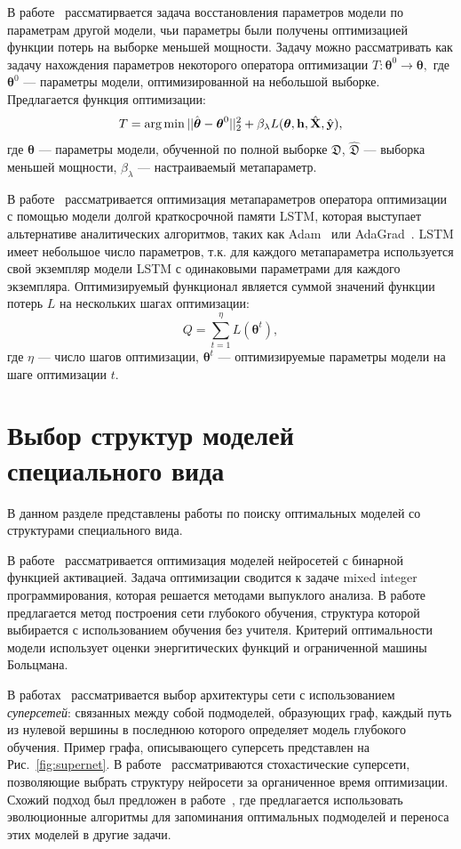 В работе~\cite{l2l} рассматирвается задача восстановления параметров модели по параметрам  другой модели, чьи параметры были получены оптимизацией функции потерь на выборке меньшей мощности. Задачу можно рассматривать как задачу нахождения параметров некоторого оператора оптимизации $T:\boldsymbol{\theta}^0 \to \boldsymbol{\theta},$ где $\boldsymbol{\theta}^0$ --- параметры модели, оптимизированной на небольшой выборке.  Предлагается функция оптимизации:
\[
    T = \operatorname*{arg\,min} ||\hat{\boldsymbol{\theta}} -  \boldsymbol{\theta}^0||_2^2 + \beta_{\lambda} L(\boldsymbol{\theta},  \mathbf{h},  \hat{\mathbf{X}}, \hat{\mathbf{y}}),
\]
где $\boldsymbol{\theta}$ --- параметры модели, обученной по полной выборке $\mathfrak{D}$, $\hat{\mathfrak{D}}$ --- выборка меньшей мощности, $\beta_{\lambda}$ --- настраиваемый метапараметр.

В работе~\cite{l2l_by_gd_gd} рассматривается оптимизация метапараметров оператора оптимизации с помощью модели долгой краткосрочной памяти LSTM, которая выступает альтернативе аналитических алгоритмов, таких как Adam~\cite{adam} или AdaGrad~\cite{adagrad}. LSTM имеет небольшое число параметров, т.к. для каждого метапараметра используется свой экземпляр модели LSTM с одинаковыми параметрами для каждого экземпляра. Оптимизируемый функционал является суммой значений функции потерь $L$ на нескольких шагах оптимизации:
\[
   Q = \sum_{t=1}^\eta L(\boldsymbol{\theta}^t),
\]
где $\eta$ --- число шагов оптимизации, $\boldsymbol{\theta}^t$ --- оптимизируемые параметры модели на шаге оптимизации $t$.


\section{Выбор структур моделей специального вида}
В данном разделе представлены работы по поиску оптимальных моделей со структурами специального вида.

В работе~\cite{mixed} рассматривается оптимизация моделей нейросетей с бинарной функцией активацией. Задача оптимизации сводится к задаче mixed integer программирования, которая решается методами выпуклого анализа.
В работе~\cite{energynet} предлагается метод построения сети глубокого обучения, структура которой выбирается с использованием обучения без учителя. Критерий оптимальности модели использует оценки энергитических функций и ограниченной машины Больцмана.

В работах~\cite{pathnet, supernet} рассматривается выбор архитектуры сети с использованием \textit{суперсетей}: связанных между собой подмоделей, образующих граф, каждый  путь из нулевой вершины в последнюю которого определяет модель глубокого обучения. Пример графа, описывающего суперсеть представлен на Рис.~\ref{fig:supernet}. В работе~\cite{supernet} рассматриваются стохастические суперсети, позволяющие выбрать структуру нейросети за органиченное время оптимизации. 
Схожий подход был предложен в работе~\cite{pathnet}, где предлагается использовать эволюционные алгоритмы для запоминания оптимальных подмоделей и переноса этих моделей в другие задачи.


